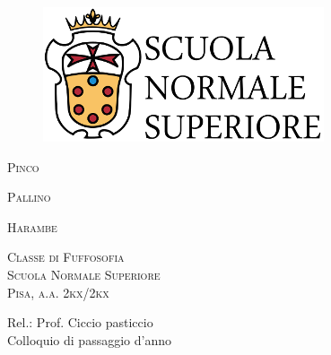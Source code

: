 \begin{titlepage}
    \begin{figure}
            \includegraphics[scale=0.45]{testimages/logosns.png}
            \flushleft
    \end{figure}
    
    \begin{center}  
        \vspace{0.5cm}
        \Huge
        \textsc{Pinco}
            
        \vspace{0.1cm}
        \LARGE
        \textsc{Pallino}
        \vspace{1.5cm}
        
        \Large
        \textsc{Harambe}
        \vspace{2.5cm}
        
        \large
        \textsc{Classe di Fuffosofia}\\
        \textsc{Scuola Normale Superiore}\\
        \textsc{Pisa, a.a. 2kx/2kx}\\
        \vfill
    \end{center}    
    \flushright
    \Large
    Rel.: Prof. Ciccio pasticcio\\
    Colloquio di passaggio d'anno
    
    \vspace{0.8cm}
    
\end{titlepage}
